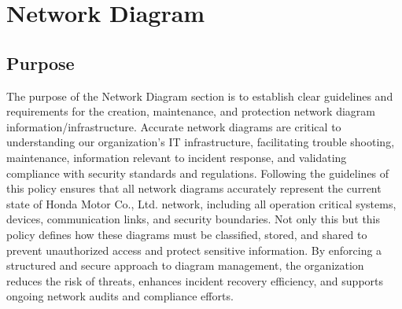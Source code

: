 \chapter{Network Diagram}
\pagestyle{fancy}

\fancyhf{}

\fancyfoot[C]{\thepage}

\renewcommand{\headrulewidth}{0pt}
\renewcommand{\footrulewidth}{0pt}

\section{Purpose}
The purpose of the Network Diagram section is to establish clear guidelines and requirements for the creation, maintenance, and protection network diagram information/infrastructure. Accurate network diagrams are critical to understanding our organization's IT infrastructure, facilitating trouble shooting, maintenance, information relevant to incident response, and validating compliance with security standards and regulations. Following the guidelines of this policy ensures that all network diagrams accurately represent the current state of Honda Motor Co., Ltd. network, including all operation critical systems, devices, communication links, and security boundaries. Not only this but this policy defines how these diagrams must be classified, stored, and shared to prevent unauthorized access and protect sensitive information. By enforcing a structured and secure approach to diagram management, the organization reduces the risk of threats, enhances incident recovery efficiency, and supports ongoing network audits and compliance efforts.
